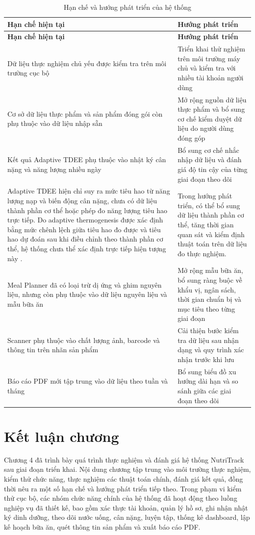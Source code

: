\documentclass[12pt, a4paper]{report}
\begin{document}
\begin{longtable}{|>{\raggedright\arraybackslash}p{5cm}|p{10cm}|}
\caption{Hạn chế và hướng phát triển của hệ thống}
\label{tab:han_che_huong_phat_trien} \\
\hline
\textbf{Hạn chế hiện tại} & \textbf{Hướng phát triển} \\
\hline
\endfirsthead
\hline
\textbf{Hạn chế hiện tại} & \textbf{Hướng phát triển} \\
\hline
\endhead

Dữ liệu thực nghiệm chủ yếu được kiểm tra trên môi trường cục bộ & Triển khai thử nghiệm trên môi trường máy chủ và kiểm tra với nhiều tài khoản người dùng \\
\hline
Cơ sở dữ liệu thực phẩm và sản phẩm đóng gói còn phụ thuộc vào dữ liệu nhập sẵn & Mở rộng nguồn dữ liệu thực phẩm và bổ sung cơ chế kiểm duyệt dữ liệu do người dùng đóng góp \\
\hline
Kết quả Adaptive TDEE phụ thuộc vào nhật ký cân nặng và năng lượng nhiều ngày & Bổ sung cơ chế nhắc nhập dữ liệu và đánh giá độ tin cậy của từng giai đoạn theo dõi \\
\hline
Adaptive TDEE hiện chỉ suy ra mức tiêu hao từ năng lượng nạp và biến động cân nặng, chưa có dữ liệu thành phần cơ thể hoặc phép đo năng lượng tiêu hao trực tiếp. Do adaptive thermogenesis được xác định bằng mức chênh lệch giữa tiêu hao đo được và tiêu hao dự đoán sau khi điều chỉnh theo thành phần cơ thể, hệ thống chưa thể xác định trực tiếp hiện tượng này \cite{nunes2022, muller2013}. & Trong hướng phát triển, có thể bổ sung dữ liệu thành phần cơ thể, tăng thời gian quan sát và kiểm định thuật toán trên dữ liệu đo thực nghiệm. \\
\hline
Meal Planner đã có loại trừ dị ứng và ghim nguyên liệu, nhưng còn phụ thuộc vào dữ liệu nguyên liệu và mẫu bữa ăn & Mở rộng mẫu bữa ăn, bổ sung ràng buộc về khẩu vị, ngân sách, thời gian chuẩn bị và mục tiêu theo từng giai đoạn \\
\hline
Scanner phụ thuộc vào chất lượng ảnh, barcode và thông tin trên nhãn sản phẩm & Cải thiện bước kiểm tra dữ liệu sau nhận dạng và quy trình xác nhận trước khi lưu \\
\hline
Báo cáo PDF mới tập trung vào dữ liệu theo tuần và tháng & Bổ sung biểu đồ xu hướng dài hạn và so sánh giữa các giai đoạn theo dõi \\
\hline
\end{longtable}


\section{Kết luận chương}Chương 4 đã trình bày quá trình thực nghiệm và đánh giá hệ thống NutriTrack sau giai đoạn triển khai. Nội dung chương tập trung vào môi trường thực nghiệm, kiểm thử chức năng, thực nghiệm các thuật toán chính, đánh giá kết quả, đồng thời nêu ra một số hạn chế và hướng phát triển tiếp theo. Trong phạm vi kiểm thử cục bộ, các nhóm chức năng chính của hệ thống đã hoạt động theo luồng nghiệp vụ đã thiết kế, bao gồm xác thực tài khoản, quản lý hồ sơ, ghi nhận nhật ký dinh dưỡng, theo dõi nước uống, cân nặng, luyện tập, thống kê dashboard, lập kế hoạch bữa ăn, quét thông tin sản phẩm và xuất báo cáo PDF.
\end{document}
